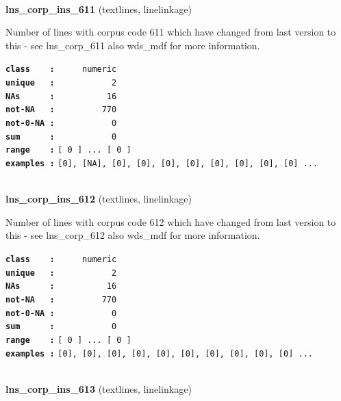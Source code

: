 \documentclass[]{article}
\begin{document}
~

\textbf{lns\_corp\_ins\_611} (textlines, linelinkage)

Number of lines with corpus code 611 which have changed from last
version to this - see lns\_corp\_611 also wds\_mdf for more information.

\textbf{\texttt{class\ \ \ \ :}} \texttt{~~~~~numeric}\\
\textbf{\texttt{unique\ \ \ :}} \texttt{~~~~~~~~~~~2}\\
\textbf{\texttt{NAs\ \ \ \ \ \ :}} \texttt{~~~~~~~~~~16}\\
\textbf{\texttt{not-NA\ \ \ :}} \texttt{~~~~~~~~~770}\\
\textbf{\texttt{not-0-NA\ :}} \texttt{~~~~~~~~~~~0}\\
\textbf{\texttt{sum\ \ \ \ \ \ :}} \texttt{~~~~~~~~~~~0}\\
\textbf{\texttt{range\ \ \ \ :}}
\texttt{{[}\ 0\ {]}\ ...\ {[}\ 0\ {]}}\\
\textbf{\texttt{examples\ :}}
\texttt{{[}0{]},\ {[}NA{]},\ {[}0{]},\ {[}0{]},\ {[}0{]},\ {[}0{]},\ {[}0{]},\ {[}0{]},\ {[}0{]},\ {[}0{]}\ ...}\\

~

\textbf{lns\_corp\_ins\_612} (textlines, linelinkage)

Number of lines with corpus code 612 which have changed from last
version to this - see lns\_corp\_612 also wds\_mdf for more information.

\textbf{\texttt{class\ \ \ \ :}} \texttt{~~~~~numeric}\\
\textbf{\texttt{unique\ \ \ :}} \texttt{~~~~~~~~~~~2}\\
\textbf{\texttt{NAs\ \ \ \ \ \ :}} \texttt{~~~~~~~~~~16}\\
\textbf{\texttt{not-NA\ \ \ :}} \texttt{~~~~~~~~~770}\\
\textbf{\texttt{not-0-NA\ :}} \texttt{~~~~~~~~~~~0}\\
\textbf{\texttt{sum\ \ \ \ \ \ :}} \texttt{~~~~~~~~~~~0}\\
\textbf{\texttt{range\ \ \ \ :}}
\texttt{{[}\ 0\ {]}\ ...\ {[}\ 0\ {]}}\\
\textbf{\texttt{examples\ :}}
\texttt{{[}0{]},\ {[}0{]},\ {[}0{]},\ {[}0{]},\ {[}0{]},\ {[}0{]},\ {[}0{]},\ {[}0{]},\ {[}0{]},\ {[}0{]}\ ...}\\

~

\textbf{lns\_corp\_ins\_613} (textlines, linelinkage)
\end{document}
